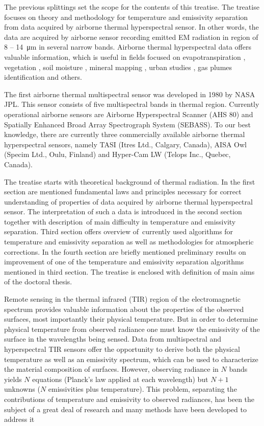 The previous splittings set the scope for the contents of this treatise. The treatise focuses on theory and methodology for temperature and emissivity separation from data acquired by airborne thermal hyperspectral sensor. In other words, the data are acquired by airborne sensor recording emitted EM radiation in region of 8 – \SI{14}{\micro\meter} in several narrow bands. Airborne thermal hyperspectral data offers valuable information, which is useful in fields focused on evapotranspiration \cite{PP12}, vegetation \cite{RC10}, soil moisture \cite{SF12}, mineral mapping \cite{NK14}, urban studies \cite{SO12}, gas plumes identification \cite{PM05} and others.

The first airborne thermal multispectral sensor was developed in 1980 by NASA JPL. This sensor consists of five multispectral bands in thermal region. Currently operational airborne sensors are Airborne Hyperspectral Scanner (AHS 80) and Spatially Enhanced Broad Array Spectrograph System (SEBASS). To our best knowledge, there are currently three commercially available airborne thermal hyperspectral sensors, namely TASI (Itres Ltd., Calgary, Canada), AISA Owl (Specim Ltd., Oulu, Finland) and Hyper-Cam LW (Telops Inc., Quebec, Canada).

The treatise starts with theoretical background of thermal radiation. In the first section are mentioned fundamental laws and principles necessary for correct understanding of properties of data acquired by airborne thermal hyperspectral sensor. The interpretation of such a data is introduced in the second section together with description~of main difficulty in temperature and emissivity separation. Third section offers overview of~currently used algorithms for temperature and emissivity separation as well as methodologies for atmospheric corrections. In the fourth section are briefly mentioned preliminary results on improvement of one of the temperature and emissivity separation algorithms mentioned in third section. The treatise is enclosed with definition of main aims of the doctoral thesis.

Remote sensing in the thermal infrared (TIR) region of the electromagnetic spectrum provides valuable information about the properties of the observed surfaces, most importantly their physical temperature. But in order to determine physical temperature from observed radiance one must know the emissivity of the surface in the wavelengths being sensed. Data from multispectral and hyperspectral TIR sensors offer the opportunity to derive both the physical temperature as well as an emissivity spectrum, which can be used to characterize the material composition of surfaces. However, observing radiance in $N$ bands yields $N$ equations (Planck's law applied at each wavelength) but $N+1$ unknowns ($N$ emissivities plus temperature). This problem, separating the contributions of temperature and emissivity to observed radiances, has been the subject of a great deal of research and many methods have been developed to address it 
 

